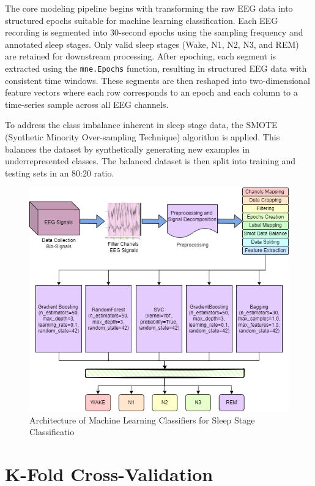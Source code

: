 The core modeling pipeline begins with transforming the raw EEG data into structured epochs suitable for machine learning classification. Each EEG recording is segmented into 30-second epochs using the sampling frequency and annotated sleep stages. Only valid sleep stages (Wake, N1, N2, N3, and REM) are retained for downstream processing. After epoching, each segment is extracted using the \texttt{mne.Epochs} function, resulting in structured EEG data with consistent time windows. These segments are then reshaped into two-dimensional feature vectors where each row corresponds to an epoch and each column to a time-series sample across all EEG channels.

To address the class imbalance inherent in sleep stage data, the SMOTE (Synthetic Minority Over-sampling Technique) algorithm is applied. This balances the dataset by synthetically generating new examples in underrepresented classes. The balanced dataset is then split into training and testing sets in an 80:20 ratio.  

\begin{figure}
	\centering
	\includegraphics[width=0.9\linewidth]{"img/paper_1/Architechture1"}
	\caption{Architecture of Machine Learning Classifiers for Sleep Stage
		Classificatio}
	\label{fig:architechture1}
\end{figure}









\section{K-Fold Cross-Validation}

